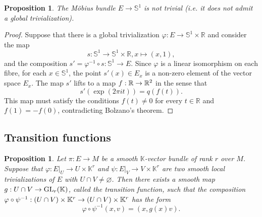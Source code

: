 \documentclass[11pt,a4paper]{book}
\newtheorem{prop}[thm]{Proposition}
\theoremstyle{remark} \newtheorem{rmk}[thm]{Remark}
\theoremstyle{definition} \newtheorem{defn}[thm]{Definition}
\theoremstyle{definition} \newtheorem{ex}[thm]{Example}
\theoremstyle{definition} \newtheorem{ej}[thm]{Exercise}
\begin{document}
\begin{prop}
The Möbius bundle $E\rightarrow \mathbb{S}^1$ is not trivial (i.e. it does not admit a global trivialization).
\end{prop}

\begin{proof}
  Suppose that there is a global trivialization $\varphi:E\rightarrow \mathbb{S}^1 \times \mathbb{R}$ and consider the map
  \begin{equation*}
s:\mathbb{S}^1 \rightarrow \mathbb{S}^1  \times \mathbb{R}, x \mapsto (x,1),
  \end{equation*}
  and the composition $s' = \varphi^{-1}\circ s: \mathbb{S}^1\rightarrow E$.
  Since $\varphi$ is a linear isomorphism on each fibre, for each $x\in \mathbb{S}^1$, the point $s'(x)\in E_x$ is a non-zero element of the vector space $E_x$. The map $s'$ lifts to a map $f:\mathbb R \rightarrow \mathbb R^2$ in the sense that
  \begin{equation*}
s'(\exp(2\pi i t)) = q(f(t)).
  \end{equation*}
  This map must satisfy the conditions $f(t)\neq 0$ for every $t\in \mathbb{R}$ and $f(1)=-f(0)$, contradicting Bolzano's theorem.
\end{proof}

\subsection{Transition functions}
\begin{prop}
  Let $\pi:E\rightarrow M$ be a smooth $\mathbb{K}$-vector bundle of rank $r$ over $M$. Suppose that $\varphi:E|_U \rightarrow U \times \mathbb{K}^r$ and $\psi:E|_V \rightarrow V \times \mathbb{K}^r$ are two smooth local trivializations of $E$ with $U\cap V \neq \varnothing$. Then there exists a smooth map $g:U\cap V \rightarrow \operatorname{GL}_r(\mathbb K)$, called the \emph{transition function}, such that the composition $\varphi \circ \psi^{-1}:(U\cap V) \times \mathbb K^r \rightarrow (U\cap V) \times \mathbb K^r$ has the form
  \begin{equation*}
\varphi \circ \psi^{-1}(x,v) = (x, g(x)v).
  \end{equation*}
\end{prop}
\end{document}
